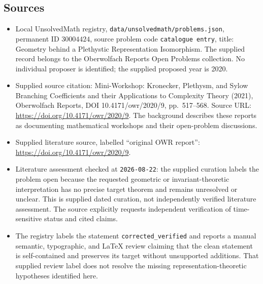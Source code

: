 \documentclass[11pt]{article}
\begin{document}
\subsection{Sources}
\begin{itemize}
\item Local UnsolvedMath registry, \texttt{data/unsolvedmath/problems.json}, permanent ID \(30004424\), source problem code \texttt{catalogue entry}, title: Geometry behind a Plethystic Representation Isomorphism. The supplied record belongs to the Oberwolfach Reports Open Problems collection. No individual proposer is identified; the supplied proposed year is 2020.
\item Supplied source citation: Mini-Workshop: Kronecker, Plethysm, and Sylow Branching Coefficients and their Applications to Complexity Theory (2021), Oberwolfach Reports, DOI 10.4171/owr/2020/9, pp.\ 517--568. Source URL: \url{https://doi.org/10.4171/owr/2020/9}. The background describes these reports as documenting mathematical workshops and their open-problem discussions.
\item Supplied literature source, labelled ``original OWR report'': \url{https://doi.org/10.4171/owr/2020/9}.
\item Literature assessment checked at \texttt{2026-08-22}: the supplied curation labels the problem open because the requested geometric or invariant-theoretic interpretation has no precise target theorem and remains unresolved or unclear. This is supplied dated curation, not independently verified literature assessment. The source explicitly requests independent verification of time-sensitive status and cited claims.
\item The registry labels the statement \texttt{corrected\_verified} and reports a manual semantic, typographic, and LaTeX review claiming that the clean statement is self-contained and preserves its target without unsupported additions. That supplied review label does not resolve the missing representation-theoretic hypotheses identified here.
\end{itemize}
\end{document}
